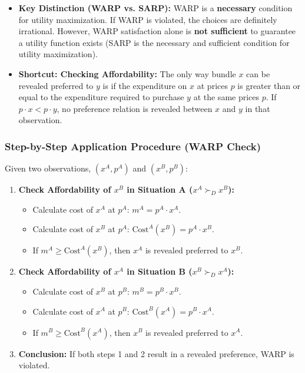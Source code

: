 \documentclass{article}
\begin{document}
\begin{itemize}
    \item \textbf{Key Distinction (WARP vs. SARP):} WARP is a \textbf{necessary} condition for utility maximization. If WARP is violated, the choices are definitely irrational. However, WARP satisfaction alone is \textbf{not sufficient} to guarantee a utility function exists (SARP is the necessary and sufficient condition for utility maximization).
    \item \textbf{Shortcut: Checking Affordability:} The only way bundle $x$ can be revealed preferred to $y$ is if the expenditure on $x$ at prices $p$ is greater than or equal to the expenditure required to purchase $y$ at the same prices $p$. If $p \cdot x < p \cdot y$, no preference relation is revealed between $x$ and $y$ in that observation.
\end{itemize}

\subsubsection*{Step-by-Step Application Procedure (WARP Check)}

Given two observations, $(x^A, p^A)$ and $(x^B, p^B)$:

\begin{enumerate}
    \item \textbf{Check Affordability of $x^B$ in Situation A ($x^A \succ_D x^B$):}
    \begin{itemize}
        \item Calculate cost of $x^A$ at $p^A$: $m^A = p^A \cdot x^A$.
        \item Calculate cost of $x^B$ at $p^A$: $\text{Cost}^A(x^B) = p^A \cdot x^B$.
        \item If $m^A \geq \text{Cost}^A(x^B)$, then $x^A$ is revealed preferred to $x^B$.
    \end{itemize}
    \item \textbf{Check Affordability of $x^A$ in Situation B ($x^B \succ_D x^A$):}
    \begin{itemize}
        \item Calculate cost of $x^B$ at $p^B$: $m^B = p^B \cdot x^B$.
        \item Calculate cost of $x^A$ at $p^B$: $\text{Cost}^B(x^A) = p^B \cdot x^A$.
        \item If $m^B \geq \text{Cost}^B(x^A)$, then $x^B$ is revealed preferred to $x^A$.
    \end{itemize}
    \item \textbf{Conclusion:} If both steps 1 and 2 result in a revealed preference, WARP is violated.
\end{enumerate}
\end{document}
